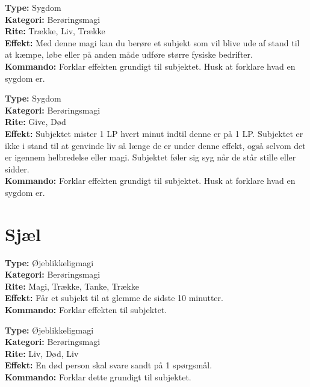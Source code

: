 \begin{sygdom*}[Spedalsk]
\textbf{Type:} Sygdom\\
\textbf{Kategori:} Berøringsmagi\\
\textbf{Rite:} Trække, Liv, Trække\\
\textbf{Effekt:} Med denne magi kan du berøre et subjekt som vil blive ude af stand til at kæmpe, løbe eller på anden måde udføre større fysiske bedrifter.\\
\textbf{Kommando:} Forklar effekten grundigt til subjektet. Husk at forklare hvad en sygdom er.
\end{sygdom*}

\begin{sygdom*}[Pest]
\textbf{Type:} Sygdom\\
\textbf{Kategori:} Berøringsmagi\\
\textbf{Rite:} Give, Død\\
\textbf{Effekt:} Subjektet mister 1 LP hvert minut indtil denne er på 1 LP. Subjektet er ikke i stand til at genvinde liv så længe de er under denne effekt, også selvom det er igennem helbredelse eller magi. Subjektet føler sig syg når de står stille eller sidder.\\
\textbf{Kommando:} Forklar effekten grundigt til subjektet. Husk at forklare hvad en sygdom er.
\end{sygdom*}

\section{Sjæl}
\begin{nSjæl*}[Glemsel]
\textbf{Type:} Øjeblikkeligmagi\\
\textbf{Kategori:} Berøringsmagi\\
\textbf{Rite:} Magi, Trække, Tanke, Trække\\
\textbf{Effekt:} Får et subjekt til at glemme de sidste 10 minutter.\\
\textbf{Kommando:} Forklar effekten til subjektet.
\end{nSjæl*}

\begin{nSjæl*}
\textbf{Type:} Øjeblikkeligmagi\\
\textbf{Kategori:} Berøringsmagi\\
\textbf{Rite:} Liv, Død, Liv\\
\textbf{Effekt:} En død person skal svare sandt på 1 spørgsmål.\\
\textbf{Kommando:} Forklar dette grundigt til subjektet.
\end{nSjæl*}

